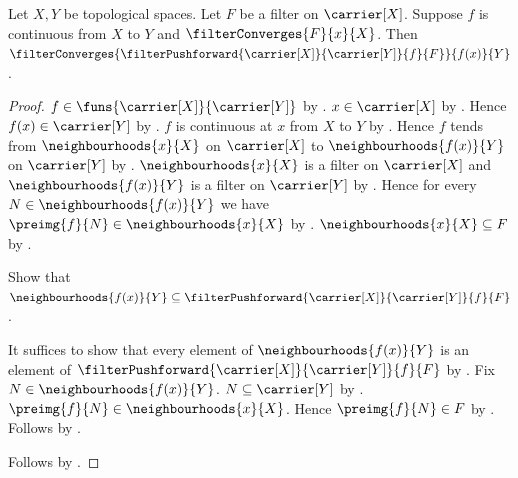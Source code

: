 \begin{theorem}\label{continuous_map_preserves_filter_limits}
    Let $X,Y$ be topological spaces.
    Let $F$ be a filter on $\carrier[X]$.
    Suppose $f$ is continuous from $X$ to $Y$ and
        $\filterConverges{F}{x}{X}$.
    Then
        $\filterConverges{
            \filterPushforward{
                \carrier[X]}{\carrier[Y]}{f}{F}
        }{f(x)}{Y}$.
\end{theorem}
\begin{proof}
    $f\in\funs{\carrier[X]}{\carrier[Y]}$ by
        .
    $x\in\carrier[X]$ by .
    Hence $f(x)\in\carrier[Y]$ by .
    $f$ is continuous at $x$ from $X$ to $Y$ by
        .
    Hence $f$ tends from $\neighbourhoods{x}{X}$ on $\carrier[X]$ to
        $\neighbourhoods{f(x)}{Y}$ on $\carrier[Y]$ by
        .
    $\neighbourhoods{x}{X}$ is a filter on $\carrier[X]$ and
        $\neighbourhoods{f(x)}{Y}$ is a filter on $\carrier[Y]$ by
        .
    Hence for every $N\in\neighbourhoods{f(x)}{Y}$ we have
        $\preimg{f}{N}\in\neighbourhoods{x}{X}$ by
        .
    $\neighbourhoods{x}{X}\subseteq F$ by
        .

    Show that $\neighbourhoods{f(x)}{Y}\subseteq
        \filterPushforward{\carrier[X]}{\carrier[Y]}{f}{F}$.
    \begin{subproof}
        It suffices to show that every element of
            $\neighbourhoods{f(x)}{Y}$ is an element of
            $\filterPushforward{\carrier[X]}{\carrier[Y]}{f}{F}$ by
            .
        Fix $N\in\neighbourhoods{f(x)}{Y}$.
        $N\subseteq\carrier[Y]$ by .
        $\preimg{f}{N}\in\neighbourhoods{x}{X}$.
        Hence $\preimg{f}{N}\in F$ by .
        Follows by .
    \end{subproof}
    Follows by .
\end{proof}
